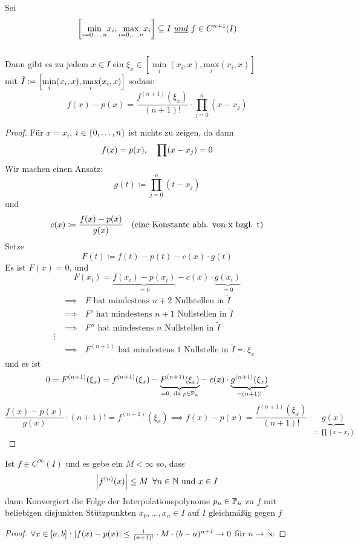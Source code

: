 \begin{theorem}
    Sei \[
    \left[\underset{i=0,\dots,n}{\min}x_i,\underset{i=0,\dots,n}{\text{max}}x_i\right] \subseteq I \ \emph{und}\ f\in 
    C^{n+1}(I)
    \]\\
    Dann gibt es zu jedem $x\in I $ ein $ \xi_x\in \left[\underset{i}{\min}(x_i,x),\underset{i}{\text{max}}(x_i,x)\right] $
   \\ mit $\Tilde{I}\coloneqq \left[\underset{i}{\min}(x_i,x),\underset{i}{\text{max}}(x_i,x)\right] $ sodass:\\
    \[
f(x)-p(x)=\frac{f^{(n+1)}(\xi_x)}{(n+1)!}\cdot\prod^n_{j=0}(x-x_j)
    \]
\end{theorem}
\begin{proof}
    Für $x=x_i$, $i\in \left\{ 0,\dots,n \right\}$ ist nichts zu zeigen, da dann \[
        f(x) = p(x), \hspace{1em} \prod(x-x_j) = 0\]
    Wir machen einen Ansatz:\[
        g(t)\coloneqq \prod_{j=0}^n(t-x_j)\]
    und \[
        c(x) \coloneqq \frac{f(x) - p(x)}{g(x)}\hspace{1em}\text{(eine Konstante abh. von x bzgl. t)}\]
    Setze \[
        F(t) \coloneqq f(t) - p(t) - c(x) \cdot g(t)\]
    Es ist $F(x) = 0$, und \[
        F(x_i) = \underset{=0}{\underbrace{f(x_i) - p(x_i)}} - c(x) \cdot 
        \underset{=0}{\underbrace{g(x_i)}}\]
    \begin{align*}
        &\implies \text{ $F$ hat mindestens $n+2$ Nullstellen in $\tilde{I}$}\\
        &\implies \text{ $F'$ hat mindestens $n+1$ Nullstellen in $\tilde{I}$}\\
        &\implies \text{ $F''$ hat mindestens $n$ Nullstellen in $\tilde{I}$}\\
        \vdots\\
    &\implies \text{ $F^{(n+1)}$ hat mindestens $1$ Nullstelle in $\tilde{I}\eqqcolon \xi_x$ }
    \end{align*}
    und es ist \[
        0 = F^{(n+1)}(\xi_x) = f^{(n+1)}(\xi_x) - \underset{=0, \text{ da } p\in\mathbb{P}_n}{\underbrace{P^{(n+1)}(\xi_x)}} - 
        c(x) \cdot \underset{=(n+1)!}{\underbrace{g^{(n+1)}(\xi_x)}}\]
    \[
        \frac{f(x) - p(x)}{g(x)} \cdot (n+1)! = f^{(n+1)}(\xi_x) \implies f(x)-p(x) = \frac{f^{(n+1)}(\xi_x)}{(n+1)!}\cdot 
        \underset{=\prod(x-x_j)}{\underbrace{g(x)}}\]
\end{proof}



\begin{corollary}
    Ist $f \in C^\infty(I)$ und es gebe ein $M<\infty$ so, dass \[
    \left\vert f^{(n)}(x) \right\vert \leq M\hspace{.5em} \forall n \in \mathbb{N} \text{ und }x\in I 
    \]
    dann Konvergiert die Folge der Interpolationspolynome $p_n\in\mathbb{P}_n$ zu $f$ mit beliebigen disjunkten Stützpunkten
    $x_0,\dots,x_n \in I$ auf $I$ gleichmäßig gegen $f$
\end{corollary}
\begin{proof}
    $\forall x\in [a,b]: \left\vert f(x)-p(x) \right\vert \leq \frac{1}{(n+1)!}\cdot M \cdot (b-a)^{n+1}\to 0$ für $n\to \infty$
\end{proof}

